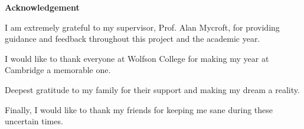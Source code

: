 \newpage
{\Huge \bf Acknowledgement}
\vspace{24pt} 


I am extremely grateful to my supervisor, Prof. Alan Mycroft, for providing guidance and feedback throughout this project and the academic year. 
\par
I would like to thank everyone at Wolfson College for making my year at Cambridge a memorable one. 
\par
Deepest gratitude to my family for their support and making my dream a reality. 
\par
Finally, I would like to thank my friends for keeping me sane during these uncertain times. 


\newpage
\vspace*{\fill}
